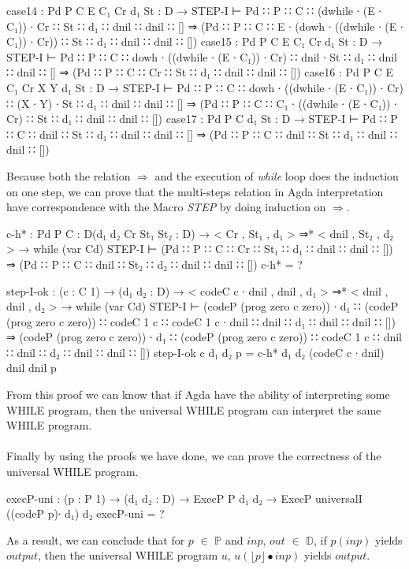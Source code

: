 \documentclass{jfrarticle}
\newcommand{\md}[1]{$\mathds{#1}$}
\begin{document}
\begin{code}[fontsize=\scriptsize]
case14 : {Pd P C E C₁ Cr d₁ St : D} 
	→  STEP-I ⊢ Pd ∷ P ∷ C ∷ (dwhile ∙ (E ∙ C₁)) ∙ Cr ∷ St ∷ d₁ ∷ dnil ∷ dnil ∷ [] 
		⇒ (Pd ∷ P ∷ C ∷ E ∙ (dowh ∙ ((dwhile ∙ (E ∙ C₁)) ∙ Cr)) ∷ St ∷ d₁ ∷ dnil ∷ dnil ∷ [])
case15 : {Pd P C E C₁ Cr d₁ St : D} 
	→  STEP-I ⊢ Pd ∷ P ∷ C ∷ dowh ∙ ((dwhile ∙ (E ∙ C₁)) ∙ Cr) ∷ dnil ∙ St ∷ d₁ ∷ dnil ∷ dnil ∷ [] 
		⇒ (Pd ∷ P ∷ C ∷ Cr ∷ St ∷ d₁ ∷ dnil ∷ dnil ∷ [])
case16 : {Pd P C E C₁ Cr X Y d₁ St : D} 
	→  STEP-I ⊢ Pd ∷ P ∷ C ∷ dowh ∙ ((dwhile ∙ (E ∙ C₁)) ∙ Cr) ∷ (X ∙ Y) ∙ St ∷ d₁ ∷ dnil ∷ dnil ∷ [] 
		⇒ (Pd ∷ P ∷ C ∷ C₁ ∙ ((dwhile ∙ (E ∙ C₁)) ∙ Cr) ∷ St ∷ d₁ ∷ dnil ∷ dnil ∷ [])
case17 : {Pd P C d₁ St : D} 
	→   STEP-I ⊢ Pd ∷ P ∷ C ∷ dnil ∷ St ∷ d₁ ∷ dnil ∷ dnil ∷ [] 
		⇒ (Pd ∷ P ∷ C ∷ dnil ∷ St ∷ d₁ ∷ dnil ∷ dnil ∷ [])
\end{code}
Because both the relation $\Rightarrow$ and the execution of \textit{while} loop does the induction on one step, we can prove that the multi-steps relation in Agda interpretation have correspondence with the Macro \textit{STEP} by doing induction on $\Rightarrow$.
\begin{code}[fontsize=\footnotesize]
c-h* : {Pd P C : D}(d₁ d₂ Cr St₁ St₂ : D) 
       → < Cr , St₁ , d₁ > ⇒* < dnil , St₂ , d₂ >
       → while (var Cd) STEP-I ⊢ (Pd ∷ P ∷ C ∷ Cr ∷ St₁ ∷ d₁ ∷ dnil ∷ dnil ∷ [])
                               ⇒ (Pd ∷ P ∷ C ∷ dnil ∷ St₂ ∷ d₂ ∷ dnil ∷ dnil ∷ [])
c-h* = ?

step-I-ok : (c : C 1) → (d₁ d₂ : D) 
            → < codeC c ∙ dnil , dnil , d₁ > ⇒* < dnil , dnil , d₂ >
            → while (var Cd) STEP-I ⊢ (codeP (prog zero c zero)) ∙ d₁ ∷
                                      (codeP (prog zero c zero)) ∷
                                      codeC {1} c ∷ codeC {1} c ∙ dnil  ∷
                                      dnil ∷ d₁ ∷ dnil ∷ dnil ∷ [])
                                    ⇒ (codeP (prog zero c zero)) ∙ d₁ ∷
                                      (codeP (prog zero c zero)) ∷
                                      codeC {1} c ∷ dnil ∷ dnil ∷
                                      d₂ ∷ dnil ∷ dnil ∷ [])
step-I-ok c d₁ d₂ p = c-h* d₁ d₂ (codeC c ∙ dnil) dnil dnil p
\end{code}
From this proof we can know that if Agda have the ability of interpreting some WHILE program, then the universal WHILE program can interpret the same WHILE program.\\\\
Finally by using the proofs we have done, we can prove the correctness of the universal WHILE program.
\begin{code}[fontsize=\small]
execP-uni :  (p : P 1) → (d₁ d₂ : D)
             → ExecP P d₁ d₂
             → ExecP universalI ((codeP p)∙ d₁) d₂
execP-uni = ?
\end{code}
As a result, we can conclude that for $p$ $\in$ \md{P} and $inp$, $out$ $\in$ \md{D}, if $p(inp)$ yields $output$, then the universal WHILE program $u$, $u(\lfloor p \rfloor \bullet inp)$ yields $output$.
\end{document}
